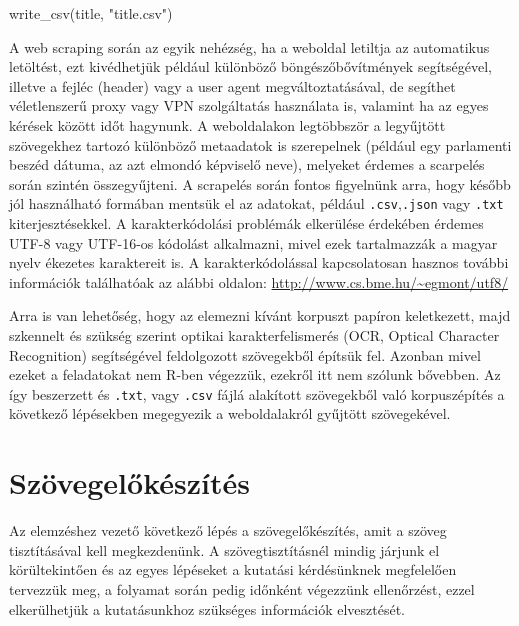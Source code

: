 \documentclass[
]{book}
\newenvironment{Shaded}{\begin{snugshade}}{\end{snugshade}}
\newcommand{\FunctionTok}[1]{\textcolor[rgb]{0.00,0.00,0.00}{#1}}
\newcommand{\NormalTok}[1]{#1}
\newcommand{\StringTok}[1]{\textcolor[rgb]{0.31,0.60,0.02}{#1}}
\begin{document}
\begin{Shaded}
\begin{Highlighting}[]

\FunctionTok{write\_csv}\NormalTok{(title, }\StringTok{"title.csv"}\NormalTok{)}
\end{Highlighting}
\end{Shaded}

A web scraping során az egyik nehézség, ha a weboldal letiltja az
automatikus letöltést, ezt kivédhetjük például különböző
böngészőbővítmények segítségével, illetve a fejléc (header) vagy a user
agent megváltoztatásával, de segíthet véletlenszerű proxy vagy VPN
szolgáltatás használata is, valamint ha az egyes kérések között időt
hagynunk. A weboldalakon legtöbbször a legyűjtött szövegekhez tartozó
különböző metaadatok is szerepelnek (például egy parlamenti beszéd
dátuma, az azt elmondó képviselő neve), melyeket érdemes a scarpelés
során szintén összegyűjteni. A scrapelés során fontos figyelnünk arra,
hogy később jól használható formában mentsük el az adatokat, például
\texttt{.csv},\texttt{.json} vagy \texttt{.txt} kiterjesztésekkel. A
karakterkódolási problémák elkerülése érdekében érdemes UTF-8 vagy
UTF-16-os kódolást alkalmazni, mivel ezek tartalmazzák a magyar nyelv
ékezetes karaktereit is. A karakterkódolással kapcsolatosan hasznos
további információk találhatóak az alábbi oldalon:
\url{http://www.cs.bme.hu/~egmont/utf8/}

Arra is van lehetőség, hogy az elemezni kívánt korpuszt papíron
keletkezett, majd szkennelt és szükség szerint optikai
karakterfelismerés (OCR, Optical Character Recognition) segítségével
feldolgozott szövegekből építsük fel. Azonban mivel ezeket a feladatokat
nem R-ben végezzük, ezekről itt nem szólunk bővebben. Az így beszerzett
és \texttt{.txt}, vagy \texttt{.csv} fájlá alakított szövegekből való
korpuszépítés a következő lépésekben megegyezik a weboldalakról gyűjtött
szövegekével.

\hypertarget{szuxf6vegelux151kuxe9szuxedtuxe9s}{%
\section{Szövegelőkészítés}\label{szuxf6vegelux151kuxe9szuxedtuxe9s}}

Az elemzéshez vezető következő lépés a szövegelőkészítés, amit a szöveg
tisztításával kell megkezdenünk. A szövegtisztításnél mindig járjunk el
körültekintően és az egyes lépéseket a kutatási kérdésünknek megfelelően
tervezzük meg, a folyamat során pedig időnként végezzünk ellenőrzést,
ezzel elkerülhetjük a kutatásunkhoz szükséges információk elvesztését.
\end{document}
